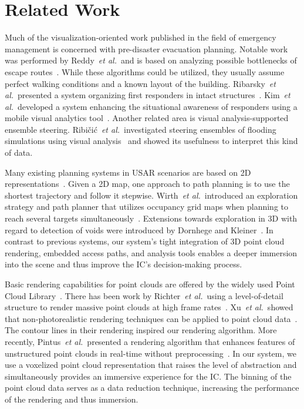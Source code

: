 \documentclass[conference,10pt,letter]{IEEEtran}
\def\IC{IC}
\def\etal{\textit{et al.}}
\begin{document}

\section{Related Work} \label{sec:relatedwork}
 Much of the visualization-oriented work published in the field of emergency management is concerned with pre-disaster evacuation planning. Notable work was performed by Reddy~\etal\ and is based on analyzing possible bottlenecks of escape routes~\cite{EuroVA12:13-17:2012}. While these algorithms could be utilized, they usually assume perfect walking conditions and a known layout of the building. Ribarsky~\etal\ presented a system organizing first responders in intact structures~\cite{Ribarsky:2010}. Kim~\etal\ developed a system enhancing the situational awareness of responders using a mobile visual analytics tool~\cite{Kim:2008}. Another related area is visual analysis-supported ensemble steering. Ribi\v{c}i\'c~\etal\ investigated steering ensembles of flooding simulations using visual analysis~\cite{6280550} and showed its usefulness to interpret this kind of data.

Many existing planning systems in USAR scenarios are based on 2D representations~\cite{kleiner_et_al_ssrr09,Pellenz2009SMU}. Given a 2D map, one approach to path planning is to use the shortest trajectory and follow it stepwise. Wirth~\etal\ introduced an exploration strategy and path planner that utilizes occupancy grid maps when planning to reach several targets simultaneously~\cite{Wirth2007ETA1}. Extensions towards exploration in 3D with regard to detection of voids were introduced by Dornhege and Kleiner~\cite{dornhege2011frontier}. In contrast to previous systems, our system's tight integration of 3D point cloud rendering, embedded access paths, and analysis tools enables a deeper immersion into the scene and thus improve the \IC 's decision-making process. 

 Basic rendering capabilities for point clouds are offered by the widely used Point Cloud Library~\cite{Rusu11ICRA}. There has been work by Richter~\etal\ using a level-of-detail structure to render massive point clouds at high frame rates~\cite{Richter:2010:ORV:1811158.1811178}. Xu~\etal\ showed that non-photorealistic rendering techniques can be applied to point cloud data~\cite{conf/npar/XuC04}. The contour lines in their rendering inspired our rendering algorithm. More recently, Pintus~\etal\ presented a rendering algorithm that enhances features of unstructured point clouds in real-time without preprocessing~\cite{Pintus:2011:RRM:2384495.2384513}. In our system, we use a voxelized point cloud representation that raises the level of abstraction and simultaneously provides an immersive experience for the \IC . The binning of the point cloud data serves as a data reduction technique, increasing the performance of the rendering and thus immersion.
\end{document}
